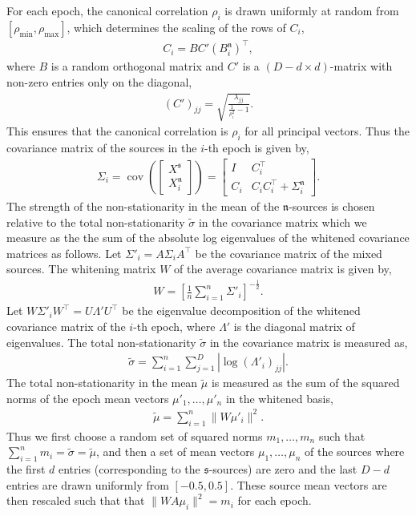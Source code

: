 \documentclass{article}
\newcommand{\1}{\ensuremath{\mathds{1}}}
\newcommand{\s}{\ensuremath{\mathfrak{s}}}
\newcommand{\n}{\ensuremath{\mathfrak{n}}}
\newcommand{\0}{\ensuremath{0}}
\DeclareMathOperator*{\cov}{cov}
\begin{document}
For each epoch, the canonical correlation $\rho_i$ is drawn uniformly at random from 
$[\rho_\text{min}, \rho_\text{max}]$, which determines the scaling of the rows of $C_i$, 
\begin{align*}
	C_i = B C' (B^\n_i)^\top, 
\end{align*}
where $B$ is a random orthogonal matrix and $C'$ is a $(D-d \times d)$-matrix with 
non-zero entries only on the diagonal, 
\begin{align*}
	(C')_{jj} = \sqrt{ \frac{\lambda_{jj}}{\frac{1}{\rho_i^2 } - 1}} . 
\end{align*}
This ensures that the canonical correlation is $\rho_i$ for all principal vectors. 
Thus the covariance matrix of the sources in the $i$-th epoch is given by, 
\begin{align*}
	\Sigma_i = \cov \left(   
		\begin{bmatrix} X^\s \\ X^\n_i
		\end{bmatrix} 
	\right) = 
	\begin{bmatrix}
		I & C^\top_i \\
		C_i & C_i  C^\top_i + \Sigma^\n_i 
	\end{bmatrix} .
\end{align*}
The strength of the non-stationarity in the mean of the \n-sources is chosen relative to the 
total non-stationarity $\tilde{\sigma}$ in the covariance matrix which we measure 
as the the sum of the absolute log eigenvalues of the whitened covariance matrices as follows.  
Let $\Sigma'_i = A \Sigma_i A^\top$ be the covariance matrix of the mixed sources. The whitening matrix 
$W$ of the average covariance matrix is given by, 
\begin{align*}
	W = \left[ \frac{1}{n} \sum_{i=1}^n \Sigma'_i \right]^{-\frac{1}{2}} .
\end{align*}
Let $W \Sigma'_i W^\top = U \Lambda' U^\top$ be the eigenvalue decomposition of the whitened covariance
matrix of the $i$-th epoch, where $\Lambda'$ is the diagonal matrix of eigenvalues. The total 
non-stationarity $\tilde{\sigma}$ in the covariance matrix is measured as,  
\begin{align*}
	\tilde{\sigma} = \sum_{i=1}^n \sum_{j=1}^{D} \left|\log (\Lambda'_i)_{jj} \right| .
\end{align*}
The total non-stationarity in the mean  $\tilde{\mu}$ is measured as the sum of the squared norms 
of the epoch mean vectors $\mu'_1, \ldots, \mu'_n$ in the whitened basis, 
\begin{align*}
	\tilde{\mu} = \sum_{i=1}^n \| W \mu'_i \|^2 . 
\end{align*}
Thus we first choose a random set of squared norms $m_1, \ldots, m_n$ such that 
$\sum_{i=1}^n m_i = \tilde{\sigma} = \tilde{\mu}$, and then a set of mean vectors 
$\mu_1, \ldots, \mu_n$ of the sources where the first $d$ entries (corresponding to the \s-sources) 
are zero and the last $D-d$ entries are drawn uniformly from $[-0.5, 0.5]$. These source
mean vectors are then rescaled such that that $\| W A \mu_i \|^2 = m_i$ for each epoch. 
\end{document}
